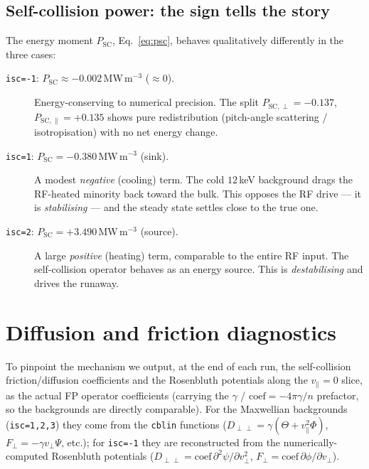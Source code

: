 \documentclass[11pt,a4paper]{article}
\begin{document}
\subsection{Self-collision power: the sign tells the story}

The energy moment $P_\text{SC}$, Eq.~\eqref{eq:psc}, behaves qualitatively
differently in the three cases:
\begin{description}
  \item[\texttt{isc=-1}: $P_\text{SC} \approx -0.002$\,MW\,m$^{-3}$ ($\approx 0$).]
    Energy-conserving to numerical precision. The split
    $P_{\mathrm{SC},\perp} = -0.137$,
    $P_{\mathrm{SC},\parallel} = +0.135$ shows pure redistribution
    (pitch-angle scattering / isotropisation) with no net energy change.
  \item[\texttt{isc=1}: $P_\text{SC} = -0.380$\,MW\,m$^{-3}$ (sink).]
    A modest \emph{negative} (cooling) term. The cold $12$\,keV background
    drags the RF-heated minority back toward the bulk. This opposes the RF
    drive --- it is \emph{stabilising} --- and the steady state settles close
    to the true one.
  \item[\texttt{isc=2}: $P_\text{SC} = +3.490$\,MW\,m$^{-3}$ (source).]
    A large \emph{positive} (heating) term, comparable to the entire RF
    input. The self-collision operator behaves as an energy source. This is
    \emph{destabilising} and drives the runaway.
\end{description}

\section{Diffusion and friction diagnostics}

To pinpoint the mechanism we output, at the end of each run, the
self-collision friction/diffusion coefficients and the Rosenbluth potentials
along the $v_\parallel = 0$ slice, as the actual FP operator coefficients
(carrying the $\gamma$ / $\text{coef}=-4\pi\gamma/n$ prefactor, so the
backgrounds are directly comparable). For the Maxwellian backgrounds
(\texttt{isc=1,2,3}) they come from the \texttt{cblin} functions
($D_{\perp\perp} = \gamma(\Theta + v_\parallel^2\Phi)$,
$F_\perp = -\gamma v_\perp\Psi$, etc.); for \texttt{isc=-1} they are
reconstructed from the numerically-computed Rosenbluth potentials
($D_{\perp\perp} = \text{coef}\,\partial^2\psi/\partial v_\perp^2$,
$F_\perp = \text{coef}\,\partial\phi/\partial v_\perp$).
\end{document}
